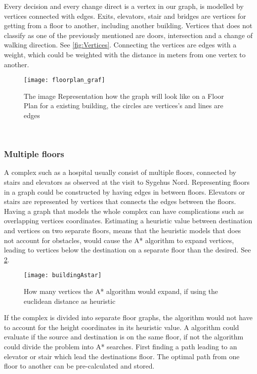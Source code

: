 Every decision and every change direct is a vertex in our graph, is modelled by vertices connected with edges. Exits, elevators, stair and bridges are vertices for getting from a floor to another, including another building. Vertices that does not classify as one of the previously mentioned are doors, intersection and a change of walking direction. See \cref{fig:Vertices}. Connecting the vertices are edges with a weight, which could be weighted with the distance in meters from one vertex to another.

\begin{figure}[ht!]
    \centering
    \texttt{[image: floorplan\_graf]}
    \caption{The image Representation how the graph will look like on a Floor Plan for a existing building, the circles are vertices's and lines are edges}
    \label{fig:floorplan_graf}
  \end{figure}
\

\subsubsection{Multiple floors}

A complex such as a hospital usually consist of multiple floors, connected by stairs and elevators as observed at the visit to Sygehus Nord. Representing floors in a graph could be constructed by having edges in between floors. Elevators or stairs are represented by vertices that connects the edges between the floors. Having a graph that models the whole complex can have complications such as overlapping vertices coordinates. Estimating a heuristic value between destination and vertices on two separate floors, means that the heuristic models that does not account for obstacles, would cause the A* algorithm to expand vertices, leading to vertices below the destination on a separate floor than the desired. See \cref{fig:buildingAstar}.

\begin{figure}[ht!]
    \centering
    \texttt{[image: buildingAstar]}
    \caption{How many vertices the A* algorithm would expand, if using the euclidean distance as heuristic}
    \label{fig:buildingAstar}
  \end{figure}

If the complex is divided into separate floor graphs, the algorithm would not have to account for the height coordinates in its heuristic value. A algorithm could evaluate if the source and destination is on the same floor, if not the algorithm could divide the problem into A* searches. First finding a path leading to an elevator or stair which lead the destinations floor. The optimal path from one floor to another can be pre-calculated and stored. 

